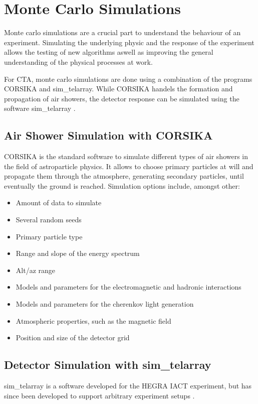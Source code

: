 \section{Monte Carlo Simulations}
Monte carlo simulations are a crucial part to 
understand the behaviour of an experiment. 
Simulating the underlying physic and the response of the experiment
allows the testing of new algorithms aswell as improving the general understanding
of the physical processes at work. 

For CTA, monte carlo simulations are done using a combination of the
programs CORSIKA and sim\_telarray.
While CORSIKA handels the formation and propagation of air showers,
the detector response can be simulated using the software
sim\_telarray \cite{BERNLOHR2008149}.

\subsection{Air Shower Simulation with CORSIKA}
CORSIKA \cite{heck1998corsika} is the standard software to simulate different types of
air showers in the field of astroparticle physics.
It allows to choose primary particles at will and
propagate them through the atmosphere, generating secondary particles, until
eventually the ground is reached.
Simulation options include, amongst other:
\begin{itemize}
  \item Amount of data to simulate
  \item Several random seeds
  \item Primary particle type
  \item Range and slope of the energy spectrum
  \item Alt/az range
  \item Models and parameters for the electromagnetic and hadronic interactions
  \item Models and parameters for the cherenkov light generation
  \item Atmospheric properties, such as the magnetic field
  \item Position and size of the detector grid
\end{itemize}

\subsection{Detector Simulation with sim\_telarray}
sim\_telarray is a software developed for the HEGRA IACT experiment,
but has since been developed to support arbitrary experiment setups \cite{BERNLOHR2008149}.

